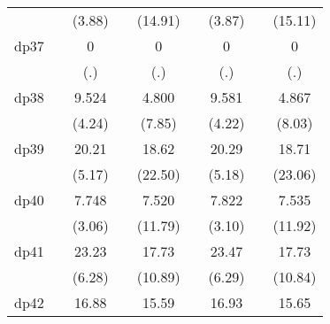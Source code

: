 {\begin{tabular}{l*{8}{c}}
            &                     &      (3.88)         &                     &     (14.91)         &                     &      (3.87)         &                     &     (15.11)         \\
[1em]
dp37        &                     &           0         &                     &           0         &                     &           0         &                     &           0         \\
            &                     &         (.)         &                     &         (.)         &                     &         (.)         &                     &         (.)         \\
[1em]
dp38        &                     &       9.524\sym{***}&                     &       4.800\sym{***}&                     &       9.581\sym{***}&                     &       4.867\sym{***}\\
            &                     &      (4.24)         &                     &      (7.85)         &                     &      (4.22)         &                     &      (8.03)         \\
[1em]
dp39        &                     &       20.21\sym{***}&                     &       18.62\sym{***}&                     &       20.29\sym{***}&                     &       18.71\sym{***}\\
            &                     &      (5.17)         &                     &     (22.50)         &                     &      (5.18)         &                     &     (23.06)         \\
[1em]
dp40        &                     &       7.748\sym{**} &                     &       7.520\sym{***}&                     &       7.822\sym{**} &                     &       7.535\sym{***}\\
            &                     &      (3.06)         &                     &     (11.79)         &                     &      (3.10)         &                     &     (11.92)         \\
[1em]
dp41        &                     &       23.23\sym{***}&                     &       17.73\sym{***}&                     &       23.47\sym{***}&                     &       17.73\sym{***}\\
            &                     &      (6.28)         &                     &     (10.89)         &                     &      (6.29)         &                     &     (10.84)         \\
[1em]
dp42        &                     &       16.88\sym{**} &                     &       15.59\sym{***}&                     &       16.93\sym{**} &                     &       15.65\sym{***}\\

\end{tabular}}
